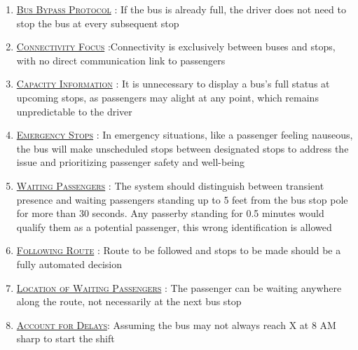 \begin{enumerate}
    \item \underline{\textsc{Bus Bypass Protocol}} : If the bus is already full, the driver does not need to stop the bus at every subsequent stop

    \item \underline{\textsc{Connectivity Focus}} :Connectivity is exclusively between buses and stops, with no direct communication link to passengers

    \item \underline{\textsc{Capacity Information}} : It is unnecessary to display a bus's full status at upcoming stops, as passengers may alight at any point, which remains unpredictable to the driver

    \item \underline{\textsc{Emergency Stops}} : In emergency situations, like a passenger feeling nauseous, the bus will make unscheduled stops between designated stops to address the issue and prioritizing passenger safety and well-being

    \item \underline{\textsc{Waiting Passengers}} : The system should distinguish between transient presence and waiting passengers standing up to 5 feet from the bus stop pole for more than 30 seconds. Any passerby standing for 0.5 minutes would qualify them as a potential passenger, this wrong identification is allowed

    \item \underline{\textsc{Following Route}} : Route to be followed and stops to be made should be a fully automated decision

    \item \underline{\textsc{Location of Waiting Passengers}} : The passenger can be waiting anywhere along the route, not necessarily at the next bus stop

    \item \underline{\textsc{Account for Delays}}: Assuming the bus may not always reach X at 8 AM sharp to start the shift
\end{enumerate}



